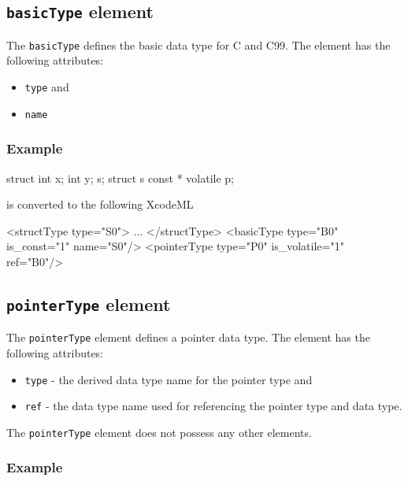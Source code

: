 \subsection{ {\tt basicType} element}

The {\tt basicType} defines the basic data type for C and C99. The element has the following attributes:

\begin{itemize}
\item {\tt type} and
\item {\tt name}
\end{itemize}

\subsubsection*{Example}

\begin{CExample}
struct {int x; int y;} s;
struct s const * volatile p;
\end{CExample}

is converted to the following XcodeML
\vspace{2mm}

\begin{XcodeMLExample}
  <structType type="S0">
    ...
  </structType>
  <basicType type="B0" is_const="1" name="S0"/>
  <pointerType type="P0" is_volatile="1" ref="B0"/>
\end{XcodeMLExample}


\subsection{ {\tt pointerType} element}

The {\tt pointerType} element defines a pointer data type. The element has the following attributes:

\begin{itemize}
\item {\tt type} - the derived data type name for the pointer type and
\item {\tt ref} - the data type name used for referencing the pointer type and data type.
\end{itemize}

The {\tt pointerType} element does not possess any other elements.

\subsubsection*{Example}

